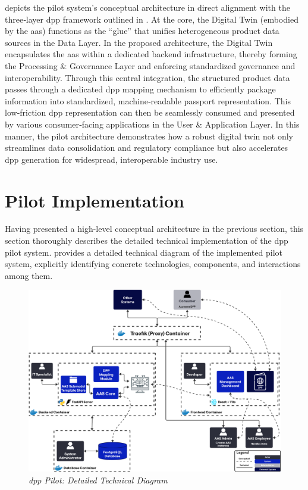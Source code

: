  depicts the pilot system’s conceptual architecture in direct alignment with the three‐layer \ac{dpp} framework outlined in . At the core, the Digital Twin (embodied by the \ac{aas}) functions as the “glue” that unifies heterogeneous product data sources in the Data Layer. In the proposed architecture, the Digital Twin encapsulates the \ac{aas} within a dedicated backend infrastructure, thereby forming the Processing \& Governance Layer and enforcing standardized governance and interoperability. Through this central integration, the structured product data passes through a dedicated \ac{dpp} mapping mechanism to efficiently package information into standardized, machine‐readable passport representation. This low‐friction \ac{dpp} representation can then be seamlessly consumed and presented by various consumer‐facing applications in the User \& Application Layer. In this manner, the pilot architecture demonstrates how a robust digital twin not only streamlines data consolidation and regulatory compliance but also accelerates \ac{dpp} generation for widespread, interoperable industry use.

\section{Pilot Implementation}
\label{sec:pilot_implementation}

Having presented a high-level conceptual architecture in the previous section, this section thoroughly describes the detailed technical implementation of the \ac{dpp} pilot system.  provides a detailed technical diagram of the implemented pilot system, explicitly identifying concrete technologies, components, and interactions among them.

\begin{figure}[htbp]
  \centering
  \includegraphics[width=\textwidth]{figures/pilot_architecture_technical.pdf}
  \caption{%
    \textit{\ac{dpp} Pilot: Detailed Technical Diagram} 
  }
  \label{fig:pilot_architecture_technical}
\end{figure}

